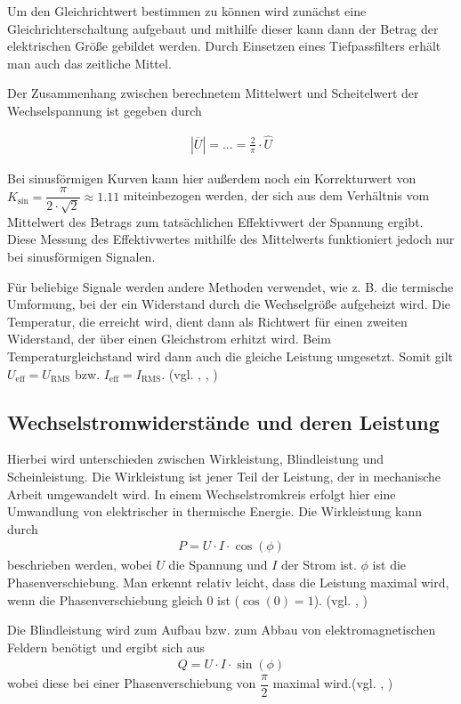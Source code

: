 \documentclass{article}
\begin{document}
Um den Gleichrichtwert bestimmen zu können wird zunächst eine Gleichrichterschaltung aufgebaut und mithilfe dieser kann dann der Betrag der elektrischen Größe gebildet werden. Durch Einsetzen eines Tiefpassfilters erhält man auch das zeitliche Mittel.

Der Zusammenhang zwischen berechnetem Mittelwert und Scheitelwert der Wechselspannung ist gegeben durch

\begin{align*}
\left|\overline{U}\right| = ... = \frac{2}{\pi}\cdot \hat{U}
\end{align*}

Bei sinusförmigen Kurven kann hier außerdem noch ein Korrekturwert von $K_{\sin} = \dfrac{\pi}{2\cdot \sqrt{2}} \approx 1.11$ miteinbezogen werden, der sich aus dem Verhältnis vom Mittelwert des Betrags zum tatsächlichen Effektivwert der Spannung ergibt. Diese Messung des Effektivwertes mithilfe des Mittelwerts funktioniert jedoch nur bei sinusförmigen Signalen.

Für beliebige Signale werden andere Methoden verwendet, wie z. B. die termische Umformung, bei der ein Widerstand durch die Wechselgröße aufgeheizt wird. Die Temperatur, die erreicht wird, dient dann als Richtwert für einen zweiten Widerstand, der über einen Gleichstrom erhitzt wird. Beim Temperaturgleichstand wird dann auch die gleiche Leistung umgesetzt. Somit gilt $U_\text{eff} = U_\text{RMS}$ bzw. $I_\text{eff} = I_\text{RMS}$. (vgl. \cite{moodle}, \cite{src3}, \cite{src5})


\subsection{Wechselstromwiderstände und deren Leistung}

Hierbei wird unterschieden zwischen Wirkleistung, Blindleistung und Scheinleistung. Die Wirkleistung ist jener Teil der Leistung, der in mechanische Arbeit umgewandelt wird. In einem Wechselstromkreis erfolgt hier eine Umwandlung von elektrischer in thermische Energie. Die Wirkleistung kann durch
\begin{align}
P = U\cdot I \cdot \cos(\phi)
\end{align}
beschrieben werden, wobei $U$ die Spannung und $I$ der Strom ist. $\phi$ ist die Phasenverschiebung. Man erkennt relativ leicht, dass die Leistung maximal wird, wenn die Phasenverschiebung gleich 0 ist ($\cos(0)=1$). (vgl. \cite{moodle}, \cite{src6})


Die Blindleistung wird zum Aufbau bzw. zum Abbau von elektromagnetischen Feldern benötigt und ergibt sich aus
\begin{align}
Q = U\cdot I \cdot \sin	(\phi)
\end{align}
wobei diese bei einer Phasenverschiebung von $\dfrac{\pi}{2}$ maximal wird.(vgl. \cite{moodle}, \cite{src6})
\end{document}
